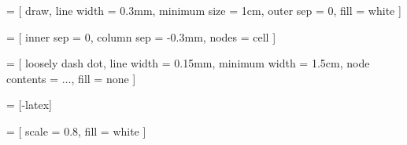  = [
  draw,
  line width = 0.3mm,
  minimum size = 1cm,
  outer sep = 0,
  fill = white
]

 = [
  inner sep = 0,
  column sep = -0.3mm,
  nodes = cell
]

 = [
  loosely dash dot,
  line width = 0.15mm,
  minimum width = 1.5cm,
  node contents = $\ldots$,
  fill = none
]

\newcommand{\ellipsis}{ \node [ellipsis]; }

 = [-latex]

 = [
  scale = 0.8,
  fill = white
]

